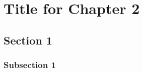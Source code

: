 
\chapter{Title for Chapter 2}\label{chapters:chapter_2}
\vspace{-7mm}

\section{Section 1}\label{sec:ch_2_sec_1}

\subsection{Subsection 1}\label{subsec:subsec_2.1.1}


\clearpage

